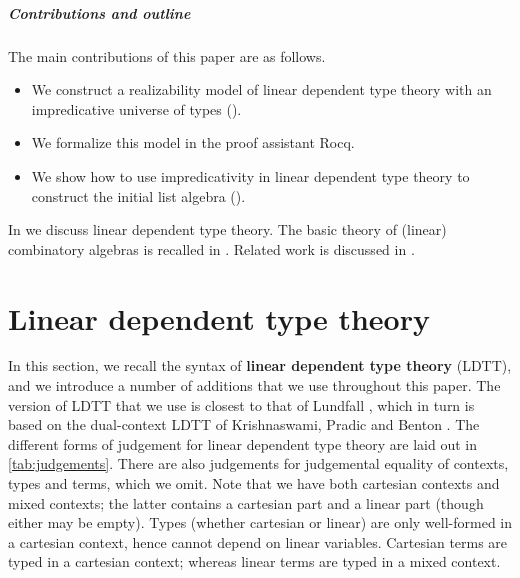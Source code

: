 \documentclass[a4paper,UKenglish,cleveref,numberwithinsect, autoref, thm-restate]{lipics-v2021}
\begin{document}
\subparagraph*{Contributions and outline}
The main contributions of this paper are as follows.
\begin{itemize}
    \item We construct a realizability model of linear dependent type theory with an impredicative universe of types ().
    \item We formalize this model in the proof assistant Rocq.
    \item We show how to use impredicativity in linear dependent type theory to construct the initial list algebra ().
\end{itemize}
In  we discuss linear dependent type theory. The basic theory of (linear) combinatory algebras is recalled in .
Related work is discussed in .

\section{Linear dependent type theory}\label{sec:dltt}
In this section, we recall the syntax of \textbf{linear dependent type theory} (LDTT),
and we introduce a number of additions that we use throughout this paper.
The version of LDTT that we use is closest to that of Lundfall \cite{lundfall:2017,Lundfall2018DiagramModel}, which in turn is based on the dual-context LDTT of Krishnaswami, Pradic and Benton \cite{DBLP:conf/popl/KrishnaswamiPB15}.
The different forms of judgement for linear dependent type theory are laid out in \autoref{tab:judgements}. There are also judgements for judgemental equality of contexts, types and terms, which we omit. Note that we have both cartesian contexts and mixed contexts; the latter contains a cartesian part and a linear part (though either may be empty). Types (whether cartesian or linear) are only well-formed in a cartesian context, hence cannot depend on linear variables. Cartesian terms are typed in a cartesian context; whereas linear terms are typed in a mixed context.
\end{document}
